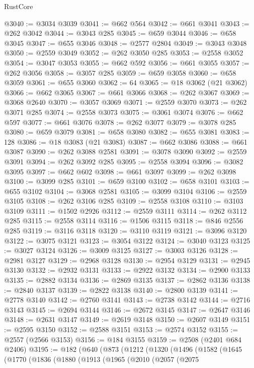 \begin{lexlean}{RustCore}
\begin{coremodule}
@3040 := @3034 @3039
@3041 := @662 @564
@3042 := @661 @3041
@3043 := @262 @3042
@3044 := @3043 @285
@3045 := @659 @3044
@3046 := @658 @3045
@3047 := @655 @3046
@3048 := @2577 @2804
@3049 := @3043 @3048
@3050 := @2559 @3049
@3052 := @262 @3050 @285
@3053 := @2558 @3052
@3054 := @3047 @3053
@3055 := @662 @592
@3056 := @661 @3055
@3057 := @262 @3056
@3058 := @3057 @285
@3059 := @659 @3058
@3060 := @658 @3059
@3061 := @655 @3060
@3062 := 64
@3065 := @18 @3062 (@21 @3062)
@3066 := @662 @3065
@3067 := @661 @3066
@3068 := @262 @3067
@3069 := @3068 @2640
@3070 := @3057 @3069
@3071 := @2559 @3070
@3073 := @262 @3071 @285
@3074 := @2558 @3073
@3075 := @3061 @3074
@3076 := @662 @597
@3077 := @661 @3076
@3078 := @262 @3077
@3079 := @3078 @285
@3080 := @659 @3079
@3081 := @658 @3080
@3082 := @655 @3081
@3083 := 128
@3086 := @18 @3083 (@21 @3083)
@3087 := @662 @3086
@3088 := @661 @3087
@3090 := @262 @3088 @2581
@3091 := @3078 @3090
@3092 := @2559 @3091
@3094 := @262 @3092 @285
@3095 := @2558 @3094
@3096 := @3082 @3095
@3097 := @662 @602
@3098 := @661 @3097
@3099 := @262 @3098
@3100 := @3099 @285
@3101 := @659 @3100
@3102 := @658 @3101
@3103 := @655 @3102
@3104 := @3068 @2581
@3105 := @3099 @3104
@3106 := @2559 @3105
@3108 := @262 @3106 @285
@3109 := @2558 @3108
@3110 := @3103 @3109
@3111 := @1502 @2926
@3112 := @2559 @3111
@3114 := @262 @3112 @285
@3115 := @2558 @3114
@3116 := @1506 @3115
@3118 := @846 @2556 @285
@3119 := @3116 @3118
@3120 := @3110 @3119
@3121 := @3096 @3120
@3122 := @3075 @3121
@3123 := @3054 @3122
@3124 := @3040 @3123
@3125 := @3027 @3124
@3126 := @3009 @3125
@3127 := @3003 @3126
@3128 := @2981 @3127
@3129 := @2968 @3128
@3130 := @2954 @3129
@3131 := @2945 @3130
@3132 := @2932 @3131
@3133 := @2922 @3132
@3134 := @2900 @3133
@3135 := @2882 @3134
@3136 := @2869 @3135
@3137 := @2862 @3136
@3138 := @2840 @3137
@3139 := @2822 @3138
@3140 := @2800 @3139
@3141 := @2778 @3140
@3142 := @2760 @3141
@3143 := @2738 @3142
@3144 := @2716 @3143
@3145 := @2694 @3144
@3146 := @2672 @3145
@3147 := @2647 @3146
@3148 := @2631 @3147
@3149 := @2619 @3148
@3150 := @2607 @3149
@3151 := @2595 @3150
@3152 := @2588 @3151
@3153 := @2574 @3152
@3155 := @2557 (@2566 @3153)
@3156 := @184 @3155
@3159 := @2508 (@2401 @684 @2406)
@3195 := @182
    (@640
      (@873
        (@1212
          (@1320
            (@1496
              (@1582
                (@1645
                  (@1770
                    (@1836
                      (@1880
                        (@1913
                          (@1965
                            (@2010
                              (@2057
                                (@2075

\end{coremodule}
\end{lexlean}
